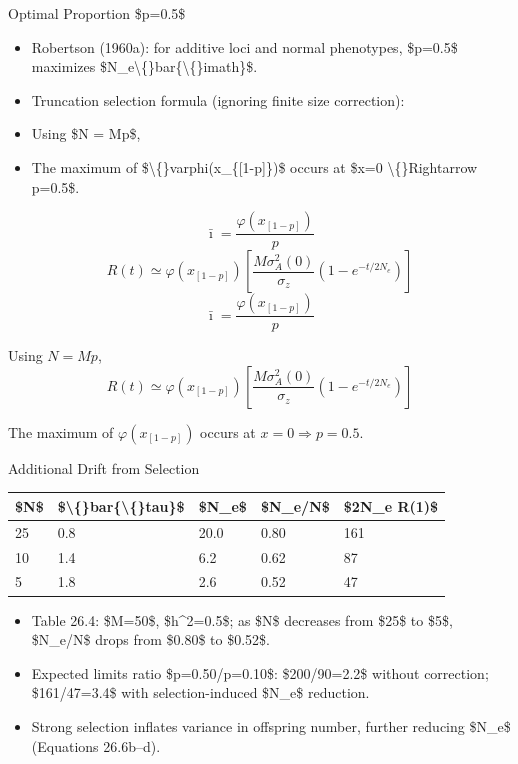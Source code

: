 \documentclass[10pt, aspectratio=169]{ctexbeamer}
\begin{document}
\begin{frame}{Optimal Proportion \$p=0.5\$}
  \begin{itemize}
    \item Robertson (1960a): for additive loci and normal phenotypes, \$p=0.5\$ maximizes \$N\_e\textbackslash\{\}bar\{\textbackslash\{\}imath\}\$.
    \item Truncation selection formula (ignoring finite size correction):
    \item Using \$N = Mp\$,
    \item The maximum of \$\textbackslash\{\}varphi(x\_\{[1-p]\})\$ occurs at \$x=0 \textbackslash\{\}Rightarrow p=0.5\$.
  \end{itemize}
  \[
    \bar{\imath} = \frac{\varphi(x_{[1-p]})}{p}
  \]
  \[
    R(t) \simeq \varphi(x_{[1-p]}) \left[\frac{M\sigma_{A}^{2}(0)}{\sigma_{z}}(1-e^{-t/2N_e})\right] \tag{26.23}
  \]
  \[
    \bar{\imath} = \frac{\varphi(x_{[1-p]})}{p} \] \item<3-> Using $N = Mp$, \[ R(t) \simeq \varphi(x_{[1-p]}) \left[\frac{M\sigma_{A}^{2}(0)}{\sigma_{z}}(1-e^{-t/2N_e})\right] \tag{26.23} \] \item<4-> The maximum of $\varphi(x_{[1-p]})$ occurs at $x=0 \Rightarrow p=0.5$.  
  \]
\end{frame}

\begin{frame}{Additional Drift from Selection}
  \begin{table}[ht]
    \centering
    \begin{tabular}{lllll}
      \toprule
      \$N\$ & \$\textbackslash\{\}bar\{\textbackslash\{\}tau\}\$ & \$N\_e\$ & \$N\_e/N\$ & \$2N\_e R(1)\$ \\
      \midrule
      25 & 0.8 & 20.0 & 0.80 & 161 \\
      10 & 1.4 & 6.2 & 0.62 & 87 \\
      5 & 1.8 & 2.6 & 0.52 & 47 \\
      \bottomrule
    \end{tabular}
  \end{table}
  \begin{itemize}
    \item Table 26.4: \$M=50\$, \$h\textasciicircum{}2=0.5\$; as \$N\$ decreases from \$25\$ to \$5\$, \$N\_e/N\$ drops from \$0.80\$ to \$0.52\$.
    \item Expected limits ratio \$p=0.50/p=0.10\$: \$200/90=2.2\$ without correction; \$161/47=3.4\$ with selection-induced \$N\_e\$ reduction.
    \item Strong selection inflates variance in offspring number, further reducing \$N\_e\$ (Equations 26.6b--d).
  \end{itemize}
\end{frame}
\end{document}
